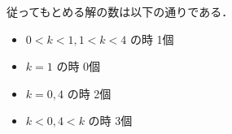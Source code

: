 \documentclass[../../main.tex]{subfiles}
\begin{document}
従ってもとめる解の数は以下の通りである．
\begin{itemize}
  \item $0 < k < 1, 1 < k < 4$ の時 1個
  \item $k = 1$ の時 0個
  \item $k = 0, 4$ の時 2個
  \item $k < 0, 4 < k$ の時 3個
\end{itemize}
\end{document}
